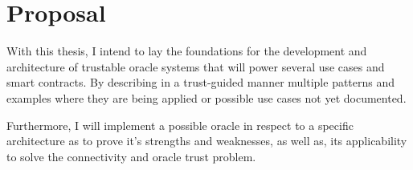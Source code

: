\section{Proposal}

With this thesis, I intend to lay the foundations for the development and architecture of trustable oracle systems that will power several use cases and smart contracts. By describing in a trust-guided manner multiple patterns and examples where they are being applied or possible use cases not yet documented.


Furthermore, I will implement a possible oracle in respect to a specific architecture as to prove it's strengths and weaknesses, as well as, its applicability to solve the connectivity and oracle trust problem.
